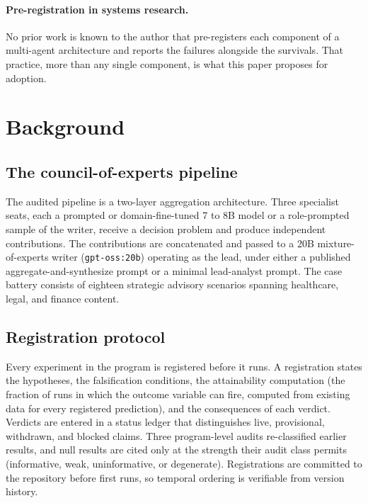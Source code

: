 \documentclass[11pt]{article}
\begin{document}
\paragraph{Pre-registration in systems research.} No prior work is
known to the author that pre-registers each component of a multi-agent
architecture and reports the failures alongside the survivals. That
practice, more than any single component, is what this paper proposes
for adoption.

\section{Background}
\label{sec:background}

\subsection{The council-of-experts pipeline}

The audited pipeline is a two-layer aggregation architecture. Three
specialist seats, each a prompted or domain-fine-tuned 7 to 8B model or
a role-prompted sample of the writer, receive a decision problem and
produce independent contributions. The contributions are concatenated
and passed to a 20B mixture-of-experts writer (\texttt{gpt-oss:20b})
operating as the lead, under either a published aggregate-and-synthesize
prompt or a minimal lead-analyst prompt. The case battery consists of
eighteen strategic advisory scenarios spanning healthcare, legal, and
finance content.

\subsection{Registration protocol}

Every experiment in the program is registered before it runs. A
registration states the hypotheses, the falsification conditions, the
attainability computation (the fraction of runs in which the outcome
variable can fire, computed from existing data for every registered
prediction), and the consequences of each verdict. Verdicts are entered
in a status ledger that distinguishes live, provisional, withdrawn, and
blocked claims. Three program-level audits re-classified earlier
results, and null results are cited only at the strength their audit
class permits (informative, weak, uninformative, or degenerate).
Registrations are committed to the repository before first runs, so
temporal ordering is verifiable from version history.
\end{document}
